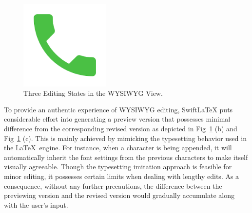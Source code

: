 \documentclass[sigconf]{acmart}
\begin{document}
\begin{figure}[t]
\begin{center}
\includegraphics[width=0.40\textwidth]{figure/test2}
\caption{Three Editing States in the WYSIWYG View.}
\label{fig:editingexample}
\end{center}
\end{figure}

To provide an authentic experience of WYSIWYG editing, SwiftLaTeX puts considerable effort into generating a preview version that possesses minimal difference from the corresponding revised version as depicted in Fig~\ref{fig:editingexample} (b) and Fig~\ref{fig:editingexample} (c).
This is mainly achieved by mimicking the typesetting behavior used in the \LaTeX\ engine. 
For instance, when a character is being appended, it will automatically inherit the font settings from the previous characters to make itself visually agreeable.
Though the typesetting imitation approach is feasible for minor editing, it possesses certain limits when dealing with lengthy edits.
As a consequence, without any further precautions, the difference between the previewing version and the revised version would gradually accumulate along with the user's input.
\end{document}
